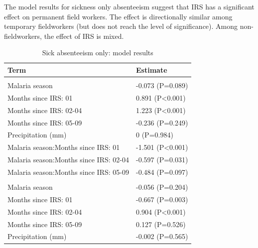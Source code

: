 \documentclass[]{article}
\begin{document}
The model results for sickness only absenteeism suggest that IRS has a
significant effect on permanent field workers. The effect is
directionally similar among temporary fieldworkers (but does not reach
the level of significance). Among non-fieldworkers, the effect of IRS is
mixed.

\begin{table}

\caption{\label{tab:unnamed-chunk-29}Sick absenteeism only: model results}
\centering
\begin{tabular}[t]{ll}
\toprule
Term & Estimate\\
\midrule
\addlinespace[1.5em]
\multicolumn{2}{l}{\textbf{Permanent field worker}}\\
\hspace{1em}Malaria season & -0.073 (P=0.089)\\
\hspace{1em}Months since IRS: 01 & 0.891 (P<0.001)\\
\hspace{1em}Months since IRS: 02-04 & 1.223 (P<0.001)\\
\hspace{1em}Months since IRS: 05-09 & -0.236 (P=0.249)\\
\hspace{1em}Precipitation (mm) & 0 (P=0.984)\\
\hspace{1em}Malaria season:Months since IRS: 01 & -1.501 (P<0.001)\\
\hspace{1em}Malaria season:Months since IRS: 02-04 & -0.597 (P=0.031)\\
\hspace{1em}Malaria season:Months since IRS: 05-09 & -0.484 (P=0.097)\\
\addlinespace[1.5em]
\multicolumn{2}{l}{\textbf{Permanent not field worker}}\\
\hspace{1em}Malaria season & -0.056 (P=0.204)\\
\hspace{1em}Months since IRS: 01 & -0.667 (P=0.003)\\
\hspace{1em}Months since IRS: 02-04 & 0.904 (P<0.001)\\
\hspace{1em}Months since IRS: 05-09 & 0.127 (P=0.526)\\
\hspace{1em}Precipitation (mm) & -0.002 (P=0.565)\\

\end{tabular}
\end{table}
\end{document}
